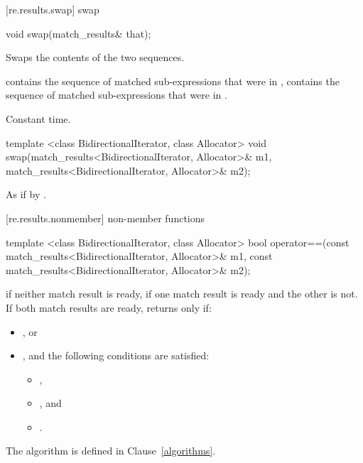 [re.results.swap]{ swap}

%
\begin{itemdecl}
void swap(match_results& that); 
\end{itemdecl}

\begin{itemdescr}
\pnum\effects  Swaps the contents of the two sequences. 

\pnum\postcondition  {} contains the sequence of matched
sub-expressions that were in ,  contains the
sequence of matched sub-expressions that were in .

\pnum\complexity Constant time. 
\end{itemdescr}

%
\begin{itemdecl}
template <class BidirectionalIterator, class Allocator>
  void swap(match_results<BidirectionalIterator, Allocator>& m1,
            match_results<BidirectionalIterator, Allocator>& m2);
\end{itemdecl}

\pnum\effects As if by .

[re.results.nonmember]{ non-member functions}

%
\begin{itemdecl}
template <class BidirectionalIterator, class Allocator>
bool operator==(const match_results<BidirectionalIterator, Allocator>& m1,
                const match_results<BidirectionalIterator, Allocator>& m2);
\end{itemdecl}

\begin{itemdescr}
\pnum
\returns
{} if neither match result is ready,  if one match result is ready and the
other is not. If both match results are ready, returns  only if:

\begin{itemize}
\item
{}, or

\item
{}, and the following conditions are satisfied:

\begin{itemize}
\item
{},

\item
{}, and

\item
{}.
\end{itemize}
\end{itemize}
\begin{note} The algorithm  is defined in Clause~\ref{algorithms}. \end{note}
\end{itemdescr}

